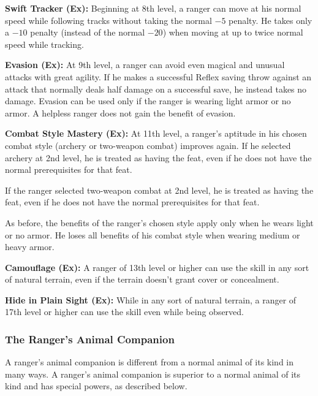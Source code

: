 \textbf{Swift Tracker (Ex):} Beginning at 8th level, a ranger can move at his normal speed while following tracks without taking the normal $-5$ penalty. He takes only a $-10$ penalty (instead of the normal $-20$) when moving at up to twice normal speed while tracking.

\textbf{Evasion (Ex):} At 9th level, a ranger can avoid even magical and unusual attacks with great agility. If he makes a successful Reflex saving throw against an attack that normally deals half damage on a successful save, he instead takes no damage. Evasion can be used only if the ranger is wearing light armor or no armor. A helpless ranger does not gain the benefit of evasion.

\textbf{Combat Style Mastery (Ex):} At 11th level, a ranger's aptitude in his chosen combat style (archery or two-weapon combat) improves again. If he selected archery at 2nd level, he is treated as having the  feat, even if he does not have the normal prerequisites for that feat.

If the ranger selected two-weapon combat at 2nd level, he is treated as having the  feat, even if he does not have the normal prerequisites for that feat.

As before, the benefits of the ranger's chosen style apply only when he wears light or no armor. He loses all benefits of his combat style when wearing medium or heavy armor.

\textbf{Camouflage (Ex):} A ranger of 13th level or higher can use the  skill in any sort of natural terrain, even if the terrain doesn't grant cover or concealment.

\textbf{Hide in Plain Sight (Ex):} While in any sort of natural terrain, a ranger of 17th level or higher can use the  skill even while being observed.


\subsubsection{The Ranger's Animal Companion}
A ranger's animal companion is different from a normal animal of its kind in many ways. A ranger's animal companion is superior to a normal animal of its kind and has special powers, as described below.

